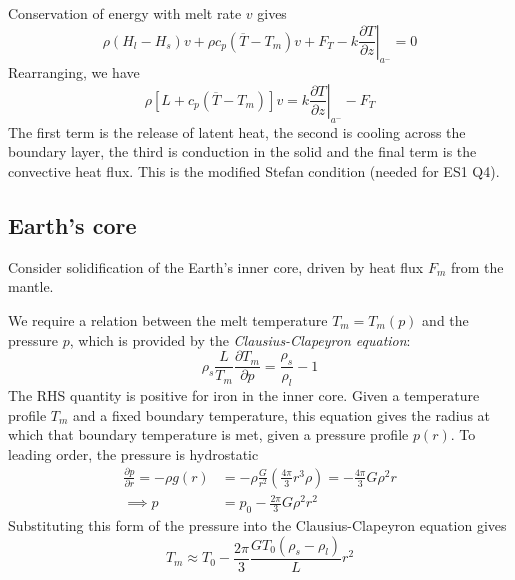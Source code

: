 \documentclass{jknotes}
\begin{document}
Conservation of energy with melt rate $v$ gives
\begin{equation}
	\rho (H_l - H_s)v + \rho c_p (\overline{T}-T_m)v + F_T - k \left.\frac{\partial
	T}{\partial z}\right|_{a^-} = 0
\end{equation}
Rearranging, we have
\begin{equation}
	\rho \left[ L + c_p(\overline{T}-T_m)\right] v = k \left.\frac{\partial
	T}{\partial z}\right|_{a^-} - F_T
\end{equation}
The first term is the release of latent heat, the second is cooling across the
boundary layer, the third is conduction in the solid and the final term is the
convective heat flux. This is the modified Stefan condition (needed for ES1
Q4).

\subsection{Earth's core}
Consider solidification of the Earth's inner core, driven by heat flux $F_m$
from the mantle. 

\begin{center}
\end{center}

We require a relation between the melt temperature $T_m = T_m(p)$ and the
pressure $p$, which is provided by the \emph{Clausius-Clapeyron equation}:
\begin{equation}
	\rho_s \frac{L}{T_m} \frac{\partial T_m}{\partial p} =
	\frac{\rho_s}{\rho_l} - 1
\end{equation}
The RHS quantity is positive for iron in the inner core.  Given a temperature
profile $T_m$ and a fixed boundary temperature, this equation gives the radius
at which that boundary temperature is met, given a pressure profile $p(r)$.
To leading order, the pressure is hydrostatic
\begin{align}
	\frac{\partial p}{\partial r} = - \rho g(r) &= - \rho \frac{G}{r^2} \left(
	\frac{4\pi}{3} r^3 \rho\right) = - \frac{4\pi}{3}G \rho^2 r \\
\implies p &= p_0 - \frac{2\pi}{3} G \rho^2 r^2
\end{align}
Substituting this form of the pressure into the Clausius-Clapeyron equation
gives
\begin{equation}
	T_m \approx T_0 - \frac{2\pi}{3} \frac{G T_0 (\rho_s - \rho_l)}{L} r^2
\end{equation}
\end{document}
